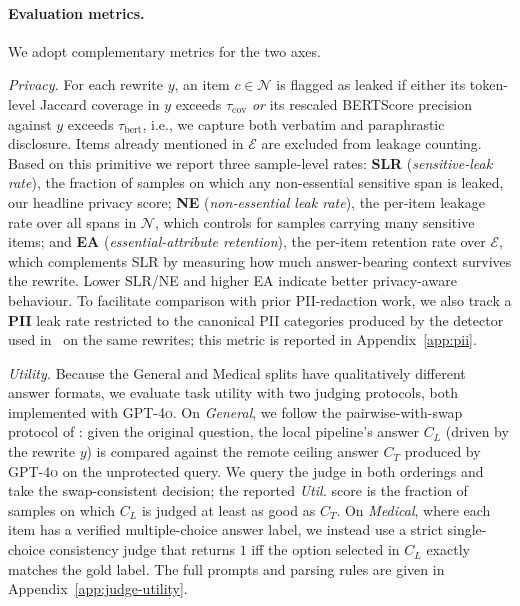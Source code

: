 \paragraph{Evaluation metrics.}
We adopt complementary metrics for the two axes.

\textit{Privacy.} For each rewrite $y$, an item $c\in\mathcal{N}$ is
flagged as leaked if either its token-level Jaccard coverage in $y$
exceeds $\tau_{\text{cov}}$ \emph{or} its rescaled BERTScore
precision~\citep{zhang2020bertscore} against $y$ exceeds
$\tau_{\text{bert}}$, i.e., we capture both verbatim and paraphrastic
disclosure. Items already mentioned in $\mathcal{E}$ are excluded
from leakage counting. Based on this primitive we report three
sample-level rates:
\textbf{SLR} (\emph{sensitive-leak rate}), the fraction of samples on
which any non-essential sensitive span is leaked, our headline
privacy score;
\textbf{NE} (\emph{non-essential leak rate}), the per-item leakage
rate over all spans in $\mathcal{N}$, which controls for samples
carrying many sensitive items; and
\textbf{EA} (\emph{essential-attribute retention}), the per-item
retention rate over $\mathcal{E}$, which complements SLR by measuring
how much answer-bearing context survives the rewrite. Lower SLR/NE
and higher EA indicate better privacy-aware behaviour. To facilitate
comparison with prior PII-redaction work, we also track a \textbf{PII}
leak rate restricted to the canonical PII categories produced by the
detector used in~\citet{prediax} on the same rewrites; this metric is
reported in Appendix~\ref{app:pii}.

\textit{Utility.} Because the General and Medical splits have
qualitatively different answer formats, we evaluate task utility with
two judging protocols, both implemented with \textsc{GPT-4o}. On
\emph{General}, we follow the pairwise-with-swap protocol of
\citet{papillon}: given the original question, the local pipeline's
answer $C_L$ (driven by the rewrite $y$) is compared against the
remote ceiling answer $C_T$ produced by \textsc{GPT-4o} on the
unprotected query. We query the judge in both orderings and take the
swap-consistent decision; the reported \textit{Util.} score is the
fraction of samples on which $C_L$ is judged at least as good as
$C_T$. On \emph{Medical}, where each item has a verified
multiple-choice answer label, we instead use a strict single-choice
consistency judge that returns $1$ iff the option selected in $C_L$
exactly matches the gold label. The full prompts and parsing rules
are given in Appendix~\ref{app:judge-utility}.

